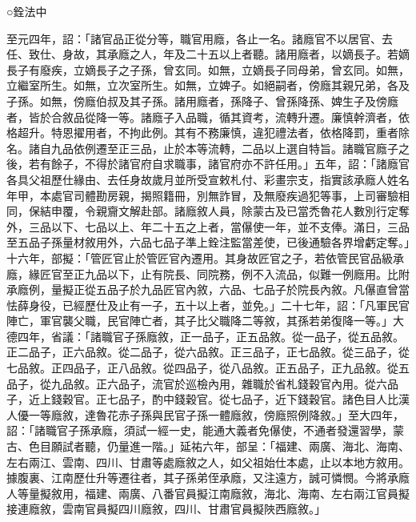 
\begin{pinyinscope}

 ○銓法中



 至元四年，詔：「諸官品正從分等，職官用廕，各止一名。諸廕官不以居官、去任、致仕、身故，其承廕之人，年及二十五以上者聽。諸用廕者，以嫡長子。若嫡長子有廢疾，立嫡長子之子孫，曾玄同。如無，立嫡長子同母弟，曾玄同。如無，立繼室所生。如無，立次室所生。如無，立婢子。如絕嗣者，傍廕其親兄弟，各及子孫。如無，傍廕伯叔及其子孫。諸用廕者，孫降子、曾孫降孫、婢生子及傍廕者，皆於合敘品從降一等。諸廕子入品職，循其資考，流轉升遷。廉慎幹濟者，依格超升。特恩擢用者，不拘此例。其有不務廉慎，違犯禮法者，依格降罰，重者除名。諸自九品依例遷至正三品，止於本等流轉，二品以上選自特旨。諸職官廕子之後，若有餘子，不得於諸官府自求職事，諸官府亦不許任用。」五年，詔：「諸廕官各具父祖歷仕緣由、去任身故歲月並所受宣敕札付、彩畫宗支，指實該承廕人姓名年甲，本處官司體勘房親，揭照籍冊，別無詐冒，及無廢疾過犯等事，上司審驗相同，保結申覆，令親齎文解赴部。諸廕敘人員，除蒙古及已當禿魯花人數別行定奪外，三品以下、七品以上、年二十五之上者，當儤使一年，並不支俸。滿日，三品至五品子孫量材敘用外，六品七品子準上銓注監當差使，已後通驗各界增虧定奪。」十六年，部擬：「管匠官止於管匠官內遷用。其身故匠官之子，若依管民官品級承廕，緣匠官至正九品以下，止有院長、同院務，例不入流品，似難一例廕用。比附承廕例，量擬正從五品子於九品匠官內敘，六品、七品子於院長內敘。凡儤直曾當怯薛身役，已經歷仕及止有一子，五十以上者，並免。」二十七年，詔：「凡軍民官陣亡，軍官襲父職，民官陣亡者，其子比父職降二等敘，其孫若弟復降一等。」大德四年，省議：「諸職官子孫廕敘，正一品子，正五品敘。從一品子，從五品敘。正二品子，正六品敘。從二品子，從六品敘。正三品子，正七品敘。從三品子，從七品敘。正四品子，正八品敘。從四品子，從八品敘。正五品子，正九品敘。從五品子，從九品敘。正六品子，流官於巡檢內用，雜職於省札錢穀官內用。從六品子，近上錢穀官。正七品子，酌中錢穀官。從七品子，近下錢穀官。諸色目人比漢人優一等廕敘，達魯花赤子孫與民官子孫一體廕敘，傍廕照例降敘。」至大四年，詔：「諸職官子孫承廕，須試一經一史，能通大義者免儤使，不通者發還習學，蒙古、色目願試者聽，仍量進一階。」延祐六年，部呈：「福建、兩廣、海北、海南、左右兩江、雲南、四川、甘肅等處廕敘之人，如父祖始仕本處，止以本地方敘用。據腹裏、江南歷仕升等遷往者，其子孫弟侄承廕，又注遠方，誠可憐憫。今將承廕人等量擬敘用，福建、兩廣、八番官員擬江南廕敘，海北、海南、左右兩江官員擬接連廕敘，雲南官員擬四川廕敘，四川、甘肅官員擬陜西廕敘。」




\end{pinyinscope}
